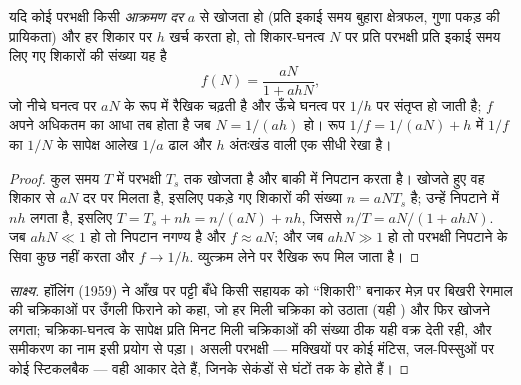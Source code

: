 \begin{theorem}[चक्रिका समीकरण]\label{thm:b1:species-interactions:holling}
यदि कोई परभक्षी किसी \emph{आक्रमण दर} $a$ से खोजता हो (प्रति इकाई समय
बुहारा क्षेत्रफल, गुणा पकड़ की प्रायिकता) और हर शिकार पर $h$ 
खर्च करता हो, तो शिकार-घनत्व $N$ पर प्रति परभक्षी प्रति इकाई समय लिए गए
शिकारों की संख्या यह है
\[
f(N) = \frac{aN}{1 + ahN} ,
\]
जो नीचे घनत्व पर $aN$ के रूप में रैखिक चढ़ती है और ऊँचे घनत्व पर
$1/h$ पर संतृप्त हो जाती है; $f$ अपने अधिकतम का आधा तब होता है जब
$N = 1/(ah)$ हो। रूप
$1/f = 1/(aN) + h$ में $1/f$ का $1/N$ के सापेक्ष आलेख $1/a$ ढाल और
$h$ अंतःखंड वाली एक सीधी रेखा है।
\end{theorem}
\begin{proof}
कुल समय $T$ में परभक्षी $T_s$ तक खोजता है और बाकी में निपटान करता है।
खोजते हुए वह शिकार से $aN$ दर पर मिलता है, इसलिए पकड़े गए शिकारों की
संख्या $n = aN T_s$ है; उन्हें निपटाने में $nh$ लगता है, इसलिए $T = T_s + nh =
n/(aN) + nh$, जिससे $n/T = aN/(1 + ahN)$. जब $ahN \ll 1$ हो तो निपटान
नगण्य है और $f \approx aN$; और जब $ahN \gg 1$ हो तो परभक्षी निपटाने के
सिवा कुछ नहीं करता और $f \to 1/h$. व्युत्क्रम लेने पर रैखिक रूप मिल जाता है।
\end{proof}
\begin{proof}[साक्ष्य]
हॉलिंग (1959) ने आँख पर पट्टी बँधे किसी सहायक को ``शिकारी'' बनाकर मेज़ पर
बिखरी रेगमाल की चक्रिकाओं पर उँगली फिराने को कहा, जो हर मिली चक्रिका को
उठाता (यही ) और फिर खोजने लगता; चक्रिका-घनत्व के सापेक्ष प्रति
मिनट मिली चक्रिकाओं की संख्या ठीक यही वक्र देती रही, और समीकरण का नाम इसी
प्रयोग से पड़ा। असली परभक्षी --- मक्खियों पर कोई मंटिस, जल-पिस्सुओं पर
कोई स्टिकलबैक --- वही आकार देते हैं, जिनके  सेकंडों से घंटों
तक के होते हैं।
\end{proof}


